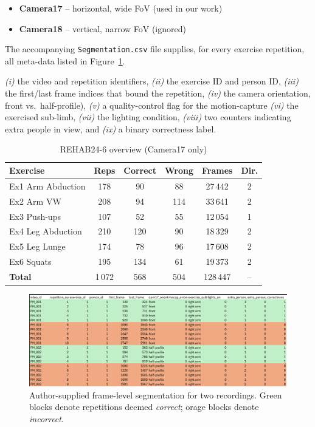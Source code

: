 \documentclass{article}
\begin{document}
\begin{itemize}
  \item \textbf{Camera17} – horizontal, wide FoV (used in our work)
  \item \textbf{Camera18} – vertical, narrow FoV (ignored)
\end{itemize}

The accompanying \texttt{Segmentation.csv} file supplies, for every
exercise repetition, all meta-data listed in
Figure~\ref{fig:dataset_example_original}.

\emph{(i)} the video and repetition identifiers,
\emph{(ii)} the exercise ID and person ID,
\emph{(iii)} the first/last frame indices that bound the repetition,
\emph{(iv)} the camera orientation, front vs.\ half-profile),
\emph{(v)} a quality-control flag for the motion-capture
\emph{(vi)} the exercised sub-limb,
\emph{(vii)} the lighting condition,
\emph{(viii)} two counters indicating extra people in view, and
\emph{(ix)} a binary correctness label.

\begin{table}[H]
  \caption{REHAB24-6 overview (Camera17 only)}
  \label{tab:data_overview}
  \centering
  \small
  \begin{tabular}{@{}lccccc@{}}
    \toprule
    Exercise & Reps & Correct & Wrong & Frames & Dir. \\ 
    \midrule
    Ex1 Arm Abduction  & 178 &  90 &  88 & 27\,442 & 2 \\ 
    Ex2 Arm VW         & 208 &  94 & 114 & 33\,641 & 2 \\ 
    Ex3 Push-ups       & 107 &  52 &  55 & 12\,054 & 1 \\ 
    Ex4 Leg Abduction  & 210 & 120 &  90 & 18\,329 & 2 \\ 
    Ex5 Leg Lunge      & 174 &  78 &  96 & 17\,608 & 2 \\ 
    Ex6 Squats         & 195 & 134 &  61 & 19\,373 & 2 \\ 
    \midrule
    \textbf{Total}     & 1\,072 & 568 & 504 & 128\,447 & -- \\ 
    \bottomrule
  \end{tabular}
\end{table}

\begin{figure}[H]
  \centering
  \includegraphics[width=.9\linewidth]{figs/dataset_example_original.png}
  \caption{Author-supplied frame-level segmentation for two recordings.
           Green blocks denote repetitions deemed \emph{correct}; orage
           blocks denote \emph{incorrect}.}
  \label{fig:dataset_example_original}
\end{figure}
\end{document}
